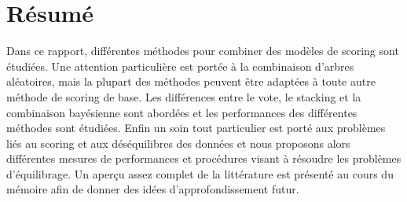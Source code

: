 
\cleardoublepage
{}
{}
\begingroup
\let\clearpage\relax
\let\cleardoublepage\relax
\let\cleardoublepage\relax

\chapter*{Résumé}

Dans ce rapport, différentes méthodes pour combiner des modèles de scoring sont étudiées. Une attention particulière est portée à la combinaison d'arbres aléatoires, mais la plupart des méthodes peuvent être adaptées à toute autre méthode de scoring de base. Les différences entre le vote, le stacking et la combinaison bayésienne sont abordées et les performances des différentes méthodes sont étudiées. Enfin un soin tout particulier est porté aux problèmes liés au scoring et aux déséquilibres des données et nous proposons alors différentes mesures de performances et procédures visant à résoudre les problèmes d'équilibrage. Un aperçu assez complet de la littérature est présenté au cours du mémoire afin de donner des idées d'approfondissement futur.





\endgroup			

\vfill

